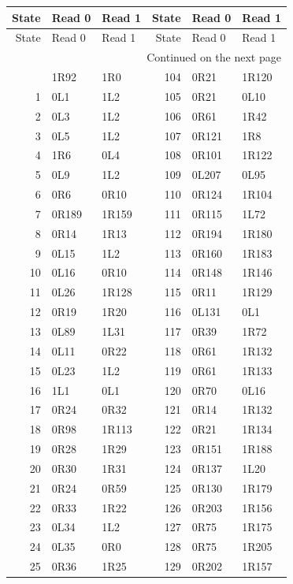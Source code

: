 \begingroup\footnotesize
\setlength{\tabcolsep}{12pt}
\begin{longtable}{@{}rll@{\hspace{24pt}}rll@{}}
\toprule
State & Read 0 & Read 1 & State & Read 0 & Read 1\\
\midrule\endfirsthead
\toprule
State & Read 0 & Read 1 & State & Read 0 & Read 1\\
\midrule\endhead
\midrule\multicolumn{6}{r}{\small Continued on the next page}\\\endfoot
\bottomrule\endlastfoot
0 & 1R92 & 1R0 & 104 & 0R21 & 1R120\\
1 & 0L1 & 1L2 & 105 & 0R21 & 0L10\\
2 & 0L3 & 1L2 & 106 & 0R61 & 1R42\\
3 & 0L5 & 1L2 & 107 & 0R121 & 1R8\\
4 & 1R6 & 0L4 & 108 & 0R101 & 1R122\\
5 & 0L9 & 1L2 & 109 & 0L207 & 0L95\\
6 & 0R6 & 0R10 & 110 & 0R124 & 1R104\\
7 & 0R189 & 1R159 & 111 & 0R115 & 1L72\\
8 & 0R14 & 1R13 & 112 & 0R194 & 1R180\\
9 & 0L15 & 1L2 & 113 & 0R160 & 1R183\\
10 & 0L16 & 0R10 & 114 & 0R148 & 1R146\\
11 & 0L26 & 1R128 & 115 & 0R11 & 1R129\\
12 & 0R19 & 1R20 & 116 & 0L131 & 0L1\\
13 & 0L89 & 1L31 & 117 & 0R39 & 1R72\\
14 & 0L11 & 0R22 & 118 & 0R61 & 1R132\\
15 & 0L23 & 1L2 & 119 & 0R61 & 1R133\\
16 & 1L1 & 0L1 & 120 & 0R70 & 0L16\\
17 & 0R24 & 0R32 & 121 & 0R14 & 1R132\\
18 & 0R98 & 1R113 & 122 & 0R21 & 1R134\\
19 & 0R28 & 1R29 & 123 & 0R151 & 1R188\\
20 & 0R30 & 1R31 & 124 & 0R137 & 1L20\\
21 & 0R24 & 0R59 & 125 & 0R130 & 1R179\\
22 & 0R33 & 1R22 & 126 & 0R203 & 1R156\\
23 & 0L34 & 1L2 & 127 & 0R75 & 1R175\\
24 & 0L35 & 0R0 & 128 & 0R75 & 1R205\\
25 & 0R36 & 1R25 & 129 & 0R202 & 1R157\\

\end{longtable}
